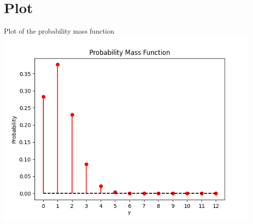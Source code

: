 \documentclass{beamer}
\begin{document}
	\section{Plot}
	\begin{frame}{Plot of the probability mass function}
		\centering
		\includegraphics[height=0.8\paperheight]{figs/fig-1.png}
	\end{frame}
	
\end{document}
